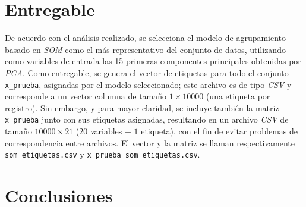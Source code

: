 \documentclass[12pt,a4paper]{article}
\begin{document}
\section{Entregable}
De acuerdo con el análisis realizado, se selecciona el modelo de agrupamiento basado en \emph{SOM} como 
el más representativo del conjunto de datos, utilizando como variables de entrada las 15 primeras 
componentes principales obtenidas por \emph{PCA}. Como entregable, se genera el vector de etiquetas para 
todo el conjunto \texttt{x\_prueba}, asignadas por el modelo seleccionado; este archivo es de tipo \emph{CSV} 
y corresponde a un vector columna de tamaño \(1\times 10000\) (una etiqueta por registro). Sin embargo, y para 
mayor claridad, se incluye también la matriz \texttt{x\_prueba} junto con sus etiquetas asignadas, resultando 
en un archivo \emph{CSV} de tamaño \(10000\times 21\) (\(20\) variables \(+\) \(1\) etiqueta), con el fin de 
evitar problemas de correspondencia entre archivos. El vector y la matriz se llaman respectivamente 
\texttt{som\_etiquetas.csv} y \texttt{x\_prueba\_som\_etiquetas.csv}.

\section{Conclusiones}
\end{document}
